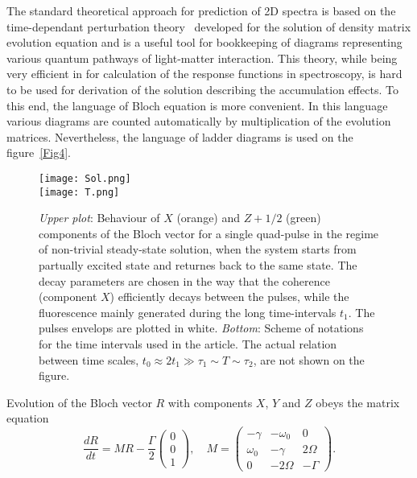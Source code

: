 \documentclass[prb,twocolumn,showpacs,epsfig,epsf]{revtex4}
\newcommand{\1}{\mathds{1}}
\begin{document}
The standard theoretical approach for prediction of 2D spectra is based on the time-dependant perturbation theory~\cite{Mbook} developed for the solution of density matrix evolution equation and is a useful tool for bookkeeping of diagrams representing various quantum pathways of light-matter interaction. This theory, while being very efficient in for calculation of the response functions in spectroscopy, is hard to be used for derivation of the solution describing the accumulation effects. To this end, the language of Bloch equation is more convenient. In this language various diagrams are counted automatically by multiplication of the evolution matrices. Nevertheless, the language of ladder diagrams is used on the figure~\ref{Fig4}.


\begin{figure}
\texttt{[image: Sol.png]}\vspace{4pt}\\
\texttt{[image: T.png]}
\caption{\small {\it Upper plot}: Behaviour of $X$ (orange) and $Z+1/2$ (green) components of the Bloch vector for a single quad-pulse in the regime of non-trivial steady-state solution, when the system starts from partually excited state and returnes back to the same state. The decay parameters are chosen in the way that the coherence (component $X$) efficiently decays between the pulses, while the fluorescence mainly generated during the long time-intervals $t_1$.  The pulses envelops are plotted in white. {\it Bottom}: Scheme of notations for the time intervals used in the article. The actual relation between time scales, $t_0\approx 2 t_1\gg \tau_1\sim T\sim\tau_2$, are not shown on the figure. \label{Fig1}}
\end{figure} Evolution of the Bloch vector $R$ with components $X$, $Y$ and $Z$ obeys the matrix equation~\cite{AEbook} 
\begin{equation}\label{Bl}
\frac{dR}{dt}= M R-\frac{\Gamma}{2}\left(\begin{array}{c}
 0\\
0\\
1
\end{array}\right),\quad
 M=\left(\begin{array}{ccc}
 -\gamma&-\omega_0&0\\
 \omega_0&-\gamma&2\Omega\\
 0&-2\Omega&-\Gamma
\end{array}\right).
\end{equation}
\end{document}
